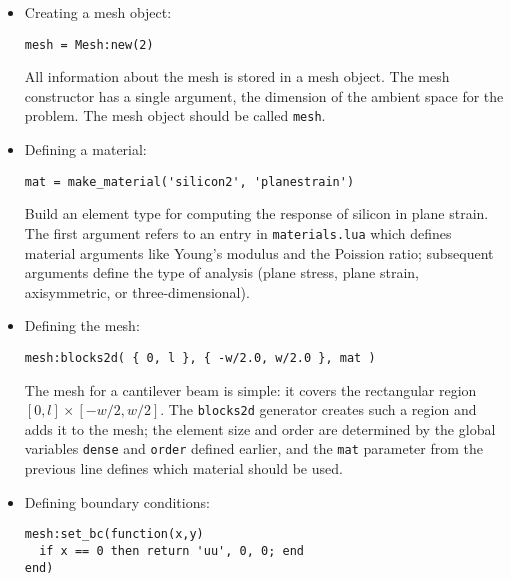 \documentclass{article}
\newcommand{\hiq}{\texttt{HiQLab}}
\newcommand{\ttt}[1]{\texttt{#1}}
\begin{document}
\begin{itemize}
The mesh file must describe both the geometry of the device and the
parameters that define the mesh.  \hiq\ includes several functions
that define regular ``blocks'' that can be tied together to form a
mesh.  The \texttt{dense} and \texttt{order} parameters control how
\hiq\ builds these blocks.  The \texttt{order} parameter is the order
of polynomial interpolation used within each element: linear,
quadratic, and cubic elements are available.  The \texttt{dense}
parameter describes the element size.

\item Creating a mesh object:
\begin{verbatim}
mesh = Mesh:new(2)
\end{verbatim}

All information about the mesh is stored in a mesh object.  The mesh
constructor has a single argument, the dimension of the ambient space
for the problem.  The mesh object should be called \ttt{mesh}.

\item Defining a material:
\begin{verbatim}
mat = make_material('silicon2', 'planestrain')
\end{verbatim}

Build an element type for computing the response of silicon in plane
strain.  The first argument refers to an entry in \ttt{materials.lua}
which defines material arguments like Young's modulus and the Poission
ratio; subsequent arguments define the type of analysis (plane stress,
plane strain, axisymmetric, or three-dimensional).


\item Defining the mesh:
\begin{verbatim}
mesh:blocks2d( { 0, l }, { -w/2.0, w/2.0 }, mat )
\end{verbatim}

The mesh for a cantilever beam is simple: it covers the rectangular
region $[0,l] \times [-w/2,w/2]$.  The \ttt{blocks2d} generator
creates such a region and adds it to the mesh; the element size and
order are determined by the global variables \ttt{dense} and
\ttt{order} defined earlier, and the \ttt{mat} parameter from the
previous line defines which material should be used.


\item Defining boundary conditions:
\begin{verbatim}
mesh:set_bc(function(x,y)
  if x == 0 then return 'uu', 0, 0; end
end)
\end{verbatim}


\end{itemize}
\end{document}
